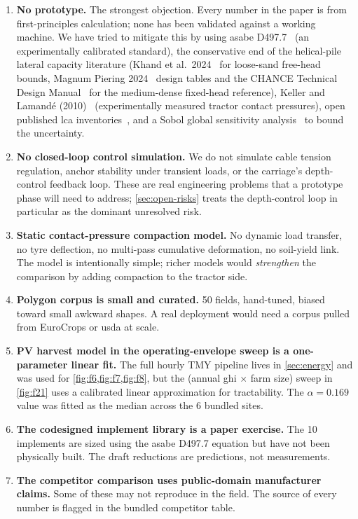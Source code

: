 \documentclass[11pt,a4paper]{article}
\begin{document}
\begin{enumerate}[leftmargin=1.8em,itemsep=0.2em]
    \item \textbf{No prototype.} The strongest objection. Every number in the paper is from first-principles calculation; none has been validated against a working machine. We have tried to mitigate this by using \gls{asabe} D497.7~\cite{asabe-d497} (an experimentally calibrated standard), the conservative end of the helical-pile lateral capacity literature (Khand et al.\ 2024~\cite{khand2024helical} for loose-sand free-head bounds, Magnum Piering 2024~\cite{magnum2024fixed} design tables and the CHANCE Technical Design Manual~\cite{chance2024manual} for the medium-dense fixed-head reference), Keller and Lamand\'e (2010)~\cite{keller2010compaction} (experimentally measured tractor contact pressures), open published \gls{lca} inventories~\cite{hammond2019ice,emilsson2019battery,fraunhoferise2022pv,hawkins2013ev,defra2023factors,eea2023electricity}, and a Sobol global sensitivity analysis~\cite{sobol2001indices,saltelli2008primer,herman2017salib} to bound the uncertainty.
    \item \textbf{No closed-loop control simulation.} We do not simulate cable tension regulation, anchor stability under transient loads, or the carriage's depth-control feedback loop. These are real engineering problems that a prototype phase will need to address; \cref{sec:open-risks} treats the depth-control loop in particular as the dominant unresolved risk.
    \item \textbf{Static contact-pressure compaction model.} No dynamic load transfer, no tyre deflection, no multi-pass cumulative deformation, no soil-yield link. The model is intentionally simple; richer models would \emph{strengthen} the comparison by adding compaction to the tractor side.
    \item \textbf{Polygon corpus is small and curated.} 50 fields, hand-tuned, biased toward small awkward shapes. A real deployment would need a corpus pulled from EuroCrops or \gls{usda} at scale.
    \item \textbf{PV harvest model in the operating-envelope sweep is a one-parameter linear fit.} The full hourly TMY pipeline lives in \cref{sec:energy} and was used for \cref{fig:f6,fig:f7,fig:f8}, but the (annual \gls{ghi} $\times$ farm size) sweep in \cref{fig:f21} uses a calibrated linear approximation for tractability. The $\alpha = 0.169$ value was fitted as the median across the 6 bundled sites.
    \item \textbf{The codesigned implement library is a paper exercise.} The 10 implements are sized using the \gls{asabe} D497.7 equation but have not been physically built. The draft reductions are predictions, not measurements.
    \item \textbf{The competitor comparison uses public-domain manufacturer claims.} Some of these may not reproduce in the field. The source of every number is flagged in the bundled competitor table.
\end{enumerate}
\end{document}
